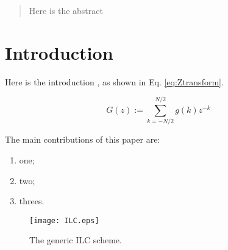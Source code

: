 \documentclass[letterpaper, 10 pt, conference]{ieeetran}
\begin{document}
\begin{abstract}
Here is the abstract    


\end{abstract}


\section{Introduction}
\label{sec:intro}

Here is the introduction \cite{chen2020iterative}, as shown in Eq. \ref{eq:Ztransform}.

\begin{equation}
G(z):=\sum_{k=-N/2}^{N/2}g(k)z^{-k}
\label{eq:Ztransform}
\end{equation}


The main contributions of this paper are: 

\begin{enumerate}
	\item one;
	\item two;
	\item threes.
\end{enumerate}

\begin{figure}[h]
 	\begin{center}
 	\texttt{[image: ILC.eps]}
 	\caption{The generic ILC scheme.}
 	\label{fig:ILC}
 	\end{center}
\end{figure}
\end{document}
